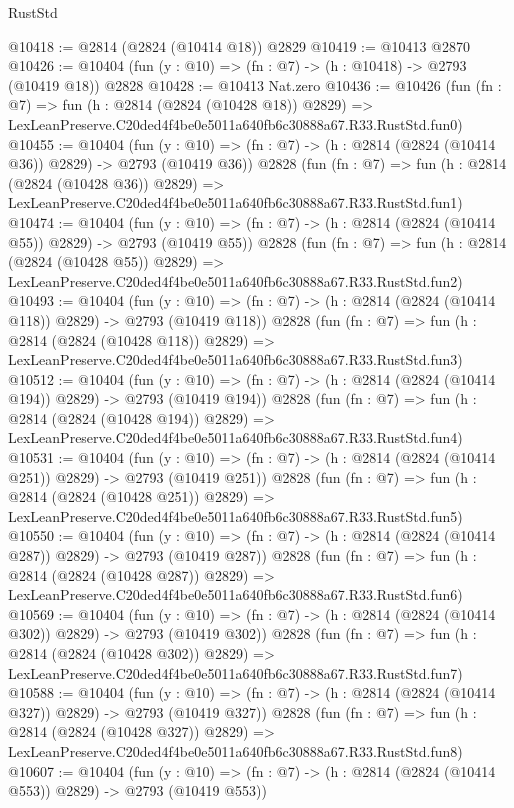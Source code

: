 \begin{lexlean}{RustStd}
\begin{coremodule}
@10418 := @2814 (@2824 (@10414 @18)) @2829
@10419 := @10413 @2870
@10426 := @10404 (fun (y : @10) => (fn : @7) -> (h : @10418) -> @2793 (@10419 @18)) @2828
@10428 := @10413 Nat.zero
@10436 := @10426
    (fun (fn : @7) =>
    fun (h : @2814 (@2824 (@10428 @18)) @2829) =>
    LexLeanPreserve.C20ded4f4be0e5011a640fb6c30888a67.R33.RustStd.fun0)
@10455 := @10404
    (fun (y : @10) => (fn : @7) -> (h : @2814 (@2824 (@10414 @36)) @2829) -> @2793 (@10419 @36))
    @2828
    (fun (fn : @7) =>
    fun (h : @2814 (@2824 (@10428 @36)) @2829) =>
    LexLeanPreserve.C20ded4f4be0e5011a640fb6c30888a67.R33.RustStd.fun1)
@10474 := @10404
    (fun (y : @10) => (fn : @7) -> (h : @2814 (@2824 (@10414 @55)) @2829) -> @2793 (@10419 @55))
    @2828
    (fun (fn : @7) =>
    fun (h : @2814 (@2824 (@10428 @55)) @2829) =>
    LexLeanPreserve.C20ded4f4be0e5011a640fb6c30888a67.R33.RustStd.fun2)
@10493 := @10404
    (fun (y : @10) => (fn : @7) -> (h : @2814 (@2824 (@10414 @118)) @2829) -> @2793 (@10419 @118))
    @2828
    (fun (fn : @7) =>
    fun (h : @2814 (@2824 (@10428 @118)) @2829) =>
    LexLeanPreserve.C20ded4f4be0e5011a640fb6c30888a67.R33.RustStd.fun3)
@10512 := @10404
    (fun (y : @10) => (fn : @7) -> (h : @2814 (@2824 (@10414 @194)) @2829) -> @2793 (@10419 @194))
    @2828
    (fun (fn : @7) =>
    fun (h : @2814 (@2824 (@10428 @194)) @2829) =>
    LexLeanPreserve.C20ded4f4be0e5011a640fb6c30888a67.R33.RustStd.fun4)
@10531 := @10404
    (fun (y : @10) => (fn : @7) -> (h : @2814 (@2824 (@10414 @251)) @2829) -> @2793 (@10419 @251))
    @2828
    (fun (fn : @7) =>
    fun (h : @2814 (@2824 (@10428 @251)) @2829) =>
    LexLeanPreserve.C20ded4f4be0e5011a640fb6c30888a67.R33.RustStd.fun5)
@10550 := @10404
    (fun (y : @10) => (fn : @7) -> (h : @2814 (@2824 (@10414 @287)) @2829) -> @2793 (@10419 @287))
    @2828
    (fun (fn : @7) =>
    fun (h : @2814 (@2824 (@10428 @287)) @2829) =>
    LexLeanPreserve.C20ded4f4be0e5011a640fb6c30888a67.R33.RustStd.fun6)
@10569 := @10404
    (fun (y : @10) => (fn : @7) -> (h : @2814 (@2824 (@10414 @302)) @2829) -> @2793 (@10419 @302))
    @2828
    (fun (fn : @7) =>
    fun (h : @2814 (@2824 (@10428 @302)) @2829) =>
    LexLeanPreserve.C20ded4f4be0e5011a640fb6c30888a67.R33.RustStd.fun7)
@10588 := @10404
    (fun (y : @10) => (fn : @7) -> (h : @2814 (@2824 (@10414 @327)) @2829) -> @2793 (@10419 @327))
    @2828
    (fun (fn : @7) =>
    fun (h : @2814 (@2824 (@10428 @327)) @2829) =>
    LexLeanPreserve.C20ded4f4be0e5011a640fb6c30888a67.R33.RustStd.fun8)
@10607 := @10404
    (fun (y : @10) => (fn : @7) -> (h : @2814 (@2824 (@10414 @553)) @2829) -> @2793 (@10419 @553))

\end{coremodule}
\end{lexlean}
